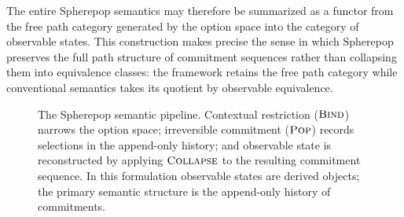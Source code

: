 \documentclass[12pt]{article}
\newcommand{\Pop}{\operatorname{\textsc{Pop}}}
\newcommand{\Bind}{\operatorname{\textsc{Bind}}}
\newcommand{\Collapse}{\operatorname{\textsc{Collapse}}}
\newcommand{\Option}{\Omega}
\newcommand{\State}{\mathcal{S}}
\newcommand{\Seq}[1]{\left[#1\right]}
\begin{document}
The entire Spherepop semantics may therefore be summarized as a functor from the free path category generated by the option space into the category of observable states. This construction makes precise the sense in which Spherepop preserves the full path structure of commitment sequences rather than collapsing them into equivalence classes: the framework retains the free path category while conventional semantics takes its quotient by observable equivalence.

\begin{figure}[h]
\centering
{}
\caption{The Spherepop semantic pipeline. Contextual restriction ($\Bind$) narrows the option space; irreversible commitment ($\Pop$) records selections in the append-only history; and observable state is reconstructed by applying $\Collapse$ to the resulting commitment sequence. In this formulation observable states are derived objects; the primary semantic structure is the append-only history of commitments.}
\end{figure}
\end{document}
